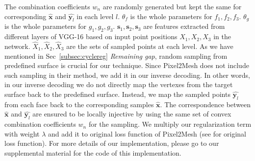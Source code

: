 The combination coefficients $w_n$ are randomly generated but kept the same for corresponding $\hat{\mathbf{x}}$ and $\hat{\mathbf{y}_l}$ in each level $l$. $\theta_f$ is the whole parameters for $f_1,f_2,f_3$. $\theta_g$ is the whole parameters for $g_1,g_2,g_3$. $\mathbf{s}_1,\mathbf{s}_2,\mathbf{s}_3$ are features extracted from different layers of VGG-16 based on input point positions $X_1,X_2,X_3$ in the network. $\hat{X}_1,\hat{X}_2,\hat{X}_3$ are the sets of sampled points at each level. 
As we have mentioned in Sec~\ref{subsec:cyclereg} \emph{Remaining gap}, random sampling from predefined surface is crucial for our technique. Since Pixel2Mesh does not include such sampling in their method, we add it in our inverse decoding. In other words, in our inverse decoding we do not directly map the vertexes from the target surface back to the predefined surface. Instead, we map the sampled points $\hat{\mathbf{y}_l}$ from each face back to the corresponding samples $\hat{\mathbf{x}}$. The correspondence between $\hat{\mathbf{x}}$ and $\hat{\mathbf{y}_l}$ are ensured to be locally injective by using the same set of convex combination coefficients $w_n$ for the sampling. We multiply our regularization term with weight $\lambda$ and add it to original loss function of Pixel2Mesh (see \cite{pixel2mesh} for original loss function). For more details of our implementation, please go to our supplemental material for the code of this implementation.
